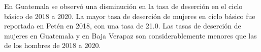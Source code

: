 \justifying En Guatemala se observó una disminución en la tasa de deserción en el ciclo básico de 2018 a 2020. La mayor tasa de deserción de mujeres en ciclo básico fue reportada en Petén en 2018, con una tasa de 21.0. Las tasas de deserción de mujeres en Guatemala y en Baja Verapaz son considerablemente menores que las de los hombres de 2018 a 2020.